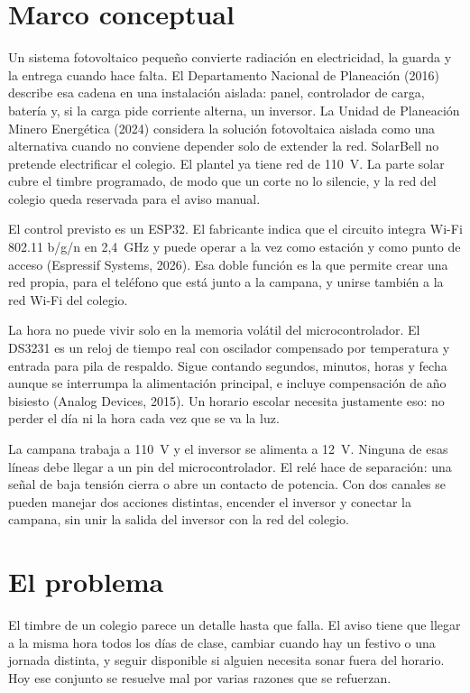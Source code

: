 \documentclass[12pt,letterpaper]{article}
\begin{document}
\section*{Marco conceptual}

Un sistema fotovoltaico pequeño convierte radiación en electricidad, la guarda y la entrega cuando hace falta. El Departamento Nacional de Planeación (2016) describe esa cadena en una instalación aislada: panel, controlador de carga, batería y, si la carga pide corriente alterna, un inversor. La Unidad de Planeación Minero Energética (2024) considera la solución fotovoltaica aislada como una alternativa cuando no conviene depender solo de extender la red. SolarBell no pretende electrificar el colegio. El plantel ya tiene red de 110~V. La parte solar cubre el timbre programado, de modo que un corte no lo silencie, y la red del colegio queda reservada para el aviso manual.

El control previsto es un ESP32. El fabricante indica que el circuito integra Wi-Fi 802.11 b/g/n en 2,4~GHz y puede operar a la vez como estación y como punto de acceso (Espressif Systems, 2026). Esa doble función es la que permite crear una red propia, para el teléfono que está junto a la campana, y unirse también a la red Wi-Fi del colegio.

La hora no puede vivir solo en la memoria volátil del microcontrolador. El DS3231 es un reloj de tiempo real con oscilador compensado por temperatura y entrada para pila de respaldo. Sigue contando segundos, minutos, horas y fecha aunque se interrumpa la alimentación principal, e incluye compensación de año bisiesto (Analog Devices, 2015). Un horario escolar necesita justamente eso: no perder el día ni la hora cada vez que se va la luz.

La campana trabaja a 110~V y el inversor se alimenta a 12~V. Ninguna de esas líneas debe llegar a un pin del microcontrolador. El relé hace de separación: una señal de baja tensión cierra o abre un contacto de potencia. Con dos canales se pueden manejar dos acciones distintas, encender el inversor y conectar la campana, sin unir la salida del inversor con la red del colegio.

\section*{El problema}

El timbre de un colegio parece un detalle hasta que falla. El aviso tiene que llegar a la misma hora todos los días de clase, cambiar cuando hay un festivo o una jornada distinta, y seguir disponible si alguien necesita sonar fuera del horario. Hoy ese conjunto se resuelve mal por varias razones que se refuerzan.
\end{document}
